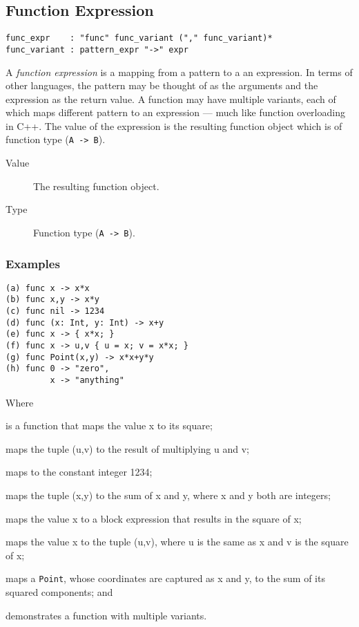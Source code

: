 \subsection{Function Expression}

\begin{lstlisting}[language=EBNF]
func_expr    : "func" func_variant ("," func_variant)*
func_variant : pattern_expr "->" expr
\end{lstlisting}

A \emph{function expression} is a mapping from a pattern to a an expression. In
terms of other languages, the pattern may be thought of as the arguments and the
expression as the return value. A function may have multiple variants, each
of which maps different pattern to an expression --- much like function
overloading in C++. The value of the expression is the resulting function object
which is of function type (\lstinline{A -> B}).

\begin{description}
	\item[Value] The resulting function object.
	\item[Type] Function type (\texttt{A -> B}).
\end{description}

\subsubsection{Examples}

\begin{lstlisting}
(a) func x -> x*x
(b) func x,y -> x*y
(c) func nil -> 1234
(d) func (x: Int, y: Int) -> x+y
(e) func x -> { x*x; }
(f) func x -> u,v { u = x; v = x*x; }
(g) func Point(x,y) -> x*x+y*y
(h) func 0 -> "zero",
         x -> "anything"
\end{lstlisting}

Where \begin{exdesc}
	\item is a function that maps the value x to its square;
	\item maps the tuple (u,v) to the result of multiplying u and v;
	\item maps to the constant integer 1234;
	\item maps the tuple (x,y) to the sum of x and y, where x and y both are
	      integers;
	\item maps the value x to a block expression that results in the square of
	      x;
	\item maps the value x to the tuple (u,v), where u is the same as x and v is
	      the square of x;
	\item maps a \lstinline{Point}, whose coordinates are captured as x and y,
	      to the sum of its squared components; and
	\item demonstrates a function with multiple variants.
\end{exdesc}
